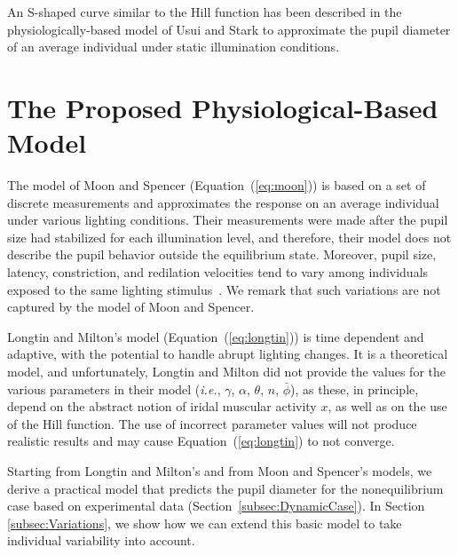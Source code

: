 \documentclass{acmtog} %
\begin{document}
An S-shaped curve similar to the Hill function has been described in the
physiologically-based model of Usui and Stark to approximate the pupil
diameter of an average individual under static illumination conditions.

\section{The Proposed Physiological-Based Model}
\label{sec:proposed_model}
%
The model of Moon and Spencer (Equation~(\ref{eq:moon})) is based on a
set of discrete measurements and approximates the response on an average
individual under various lighting conditions. Their measurements were
made after the pupil size had stabilized for each illumination level,
and therefore, their model does not describe the pupil behavior outside
the equilibrium state. Moreover, pupil size, latency, constriction, and
redilation velocities tend to vary among individuals exposed to the same
lighting stimulus~\cite{GPMBH-2005}. We remark that such variations are
not captured by the model of Moon and Spencer.

Longtin and Milton's model (Equation~(\ref{eq:longtin})) is time
dependent and adaptive, with the potential to handle abrupt lighting
changes. It is a theoretical model, and unfortunately, Longtin and
Milton did not provide the values for the various parameters in their
model (\emph{i.e.}, $\gamma$, $\alpha$, $\theta$, $n$, $\bar{\phi}$), as
these, in principle, depend on the abstract notion of iridal muscular
activity $x$, as well as on the use of the Hill function. The use of
incorrect parameter values will not produce realistic results and may
cause Equation~(\ref{eq:longtin}) to not converge.

Starting from Longtin and Milton's and from Moon and Spencer's models,
we derive a practical model that predicts the pupil diameter for the
nonequilibrium case based on experimental data
(Section~\ref{subsec:DynamicCase}). In Section \ref{subsec:Variations},
we show how we can extend this basic model to take individual
variability into account.
\end{document}
